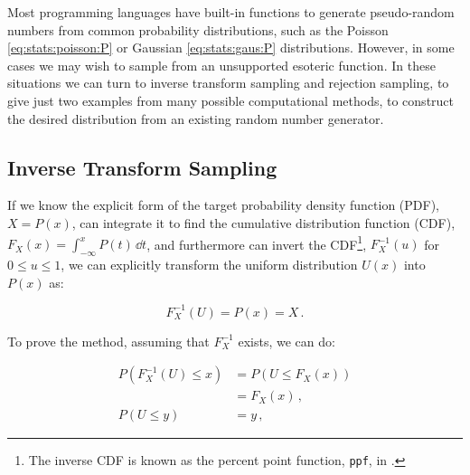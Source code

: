 Most programming languages have built-in functions to generate
pseudo-random numbers from common probability distributions,
such as the Poisson \cref{eq:stats:poisson:P} or Gaussian \cref{eq:stats:gaus:P} distributions.
However, in some cases we may wish to sample from an unsupported esoteric function.
In these situations we can turn to inverse transform sampling and rejection sampling,
to give just two examples from many possible computational methods,
to construct the desired distribution from an existing random number generator.

\subsection{Inverse Transform Sampling}
\label{misc:sampling_prob_dist:inverse}

If we know the explicit form of the target probability density function (PDF), $X = P\left(x\right)$,
can integrate it to find the cumulative distribution function (CDF), $F_{X}\left(x\right) = \int_{-\infty}^{x} P\left(t\right) \, \dd{t}$,
and furthermore can invert the CDF\footnote{The inverse CDF
is known as the percent point function, \texttt{ppf},
in \href{https://docs.scipy.org/doc/scipy/reference/stats.html}{\scipy}.}, $F^{-1}_{X}\left(u\right)$ for $0 \leq u \leq 1$,
we can explicitly transform the uniform distribution $U\left(x\right)$ into $P\left(x\right)$ as:

\begin{equation}\label{eq:stats:sampling_prob_dist:inverse}
F^{-1}_{X}\left(U\right) = P\left(x\right) = X\,.
\end{equation}

To prove the method, assuming that $F^{-1}_{X}$ exists, we can do:

\begin{subequations}\label{eq:stats:sampling_prob_dist:inverse_proof}
\begin{align}
P\left(F^{-1}_{X}\left(U\right) \leq x\right) &= P\left(U \leq F_{X}\left(x\right) \right) \label{eq:stats:sampling_prob_dist:inverse_proof:inverse} \\
&= F_{X}\left(x\right)\,,\label{eq:stats:sampling_prob_dist:inverse_proof:def} \\
P\left(U \leq y\right) &= y\,, \label{eq:stats:sampling_prob_dist:inverse_proof:U}
\end{align}
\end{subequations}

